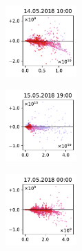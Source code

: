 \begin{figure}[H]
    \centering
    \begin{subfigure}
        \centering
        \includegraphics[width=0.30\textwidth,valign=t]{evaluation/figures/perturbations/perturbation-14.05.2018:10.00-so2-div-1.01.pdf}
    \end{subfigure}
    \begin{subfigure}
        \centering
        \includegraphics[width=0.30\textwidth,valign=t]{evaluation/figures/perturbations/perturbation-15.05.2018:19.00-so2-div-1.01.pdf}
    \end{subfigure}
    \begin{subfigure}
        \centering
        \includegraphics[width=0.30\textwidth,valign=t]{evaluation/figures/perturbations/perturbation-17.05.2018:00.00-so2-div-1.01.pdf}
    \end{subfigure}


\end{figure}
